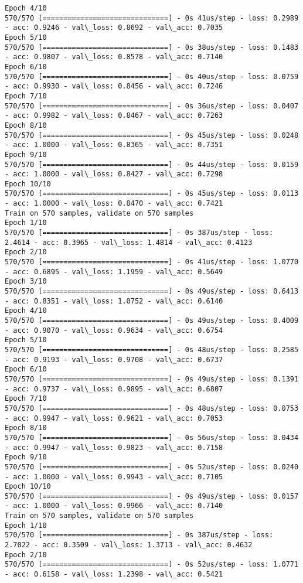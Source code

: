 \documentclass[11pt]{article}
\begin{document}
\begin{Verbatim}[commandchars=\\\{\}]
Epoch 4/10
570/570 [==============================] - 0s 41us/step - loss: 0.2989 - acc: 0.9246 - val\_loss: 0.8692 - val\_acc: 0.7035
Epoch 5/10
570/570 [==============================] - 0s 38us/step - loss: 0.1483 - acc: 0.9807 - val\_loss: 0.8578 - val\_acc: 0.7140
Epoch 6/10
570/570 [==============================] - 0s 40us/step - loss: 0.0759 - acc: 0.9930 - val\_loss: 0.8456 - val\_acc: 0.7246
Epoch 7/10
570/570 [==============================] - 0s 36us/step - loss: 0.0407 - acc: 0.9982 - val\_loss: 0.8467 - val\_acc: 0.7263
Epoch 8/10
570/570 [==============================] - 0s 45us/step - loss: 0.0248 - acc: 1.0000 - val\_loss: 0.8365 - val\_acc: 0.7351
Epoch 9/10
570/570 [==============================] - 0s 44us/step - loss: 0.0159 - acc: 1.0000 - val\_loss: 0.8427 - val\_acc: 0.7298
Epoch 10/10
570/570 [==============================] - 0s 45us/step - loss: 0.0113 - acc: 1.0000 - val\_loss: 0.8470 - val\_acc: 0.7421
Train on 570 samples, validate on 570 samples
Epoch 1/10
570/570 [==============================] - 0s 387us/step - loss: 2.4614 - acc: 0.3965 - val\_loss: 1.4814 - val\_acc: 0.4123
Epoch 2/10
570/570 [==============================] - 0s 41us/step - loss: 1.0770 - acc: 0.6895 - val\_loss: 1.1959 - val\_acc: 0.5649
Epoch 3/10
570/570 [==============================] - 0s 49us/step - loss: 0.6413 - acc: 0.8351 - val\_loss: 1.0752 - val\_acc: 0.6140
Epoch 4/10
570/570 [==============================] - 0s 49us/step - loss: 0.4009 - acc: 0.9070 - val\_loss: 0.9634 - val\_acc: 0.6754
Epoch 5/10
570/570 [==============================] - 0s 48us/step - loss: 0.2585 - acc: 0.9193 - val\_loss: 0.9708 - val\_acc: 0.6737
Epoch 6/10
570/570 [==============================] - 0s 49us/step - loss: 0.1391 - acc: 0.9737 - val\_loss: 0.9895 - val\_acc: 0.6807
Epoch 7/10
570/570 [==============================] - 0s 48us/step - loss: 0.0753 - acc: 0.9947 - val\_loss: 0.9621 - val\_acc: 0.7053
Epoch 8/10
570/570 [==============================] - 0s 56us/step - loss: 0.0434 - acc: 0.9947 - val\_loss: 0.9823 - val\_acc: 0.7158
Epoch 9/10
570/570 [==============================] - 0s 52us/step - loss: 0.0240 - acc: 1.0000 - val\_loss: 0.9943 - val\_acc: 0.7105
Epoch 10/10
570/570 [==============================] - 0s 49us/step - loss: 0.0157 - acc: 1.0000 - val\_loss: 0.9966 - val\_acc: 0.7140
Train on 570 samples, validate on 570 samples
Epoch 1/10
570/570 [==============================] - 0s 387us/step - loss: 2.7022 - acc: 0.3509 - val\_loss: 1.3713 - val\_acc: 0.4632
Epoch 2/10
570/570 [==============================] - 0s 52us/step - loss: 1.0771 - acc: 0.6158 - val\_loss: 1.2398 - val\_acc: 0.5421

\end{Verbatim}
\end{document}
